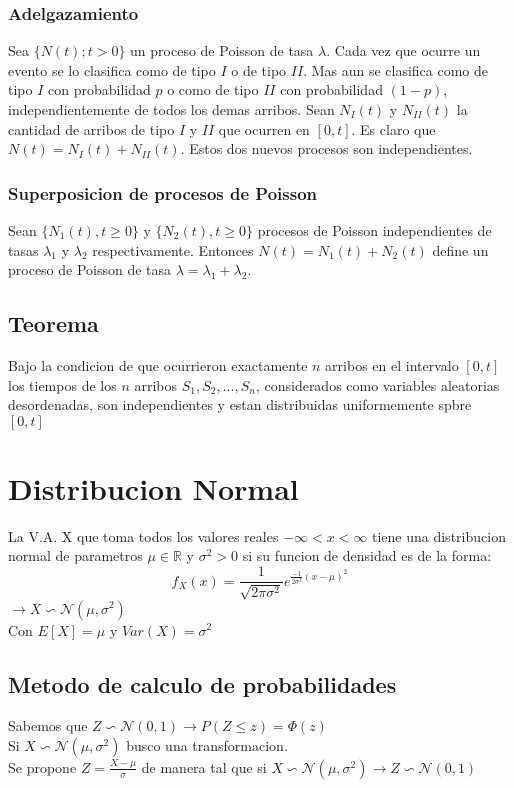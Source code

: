 \documentclass[titlepage,a4paper]{article}
\begin{document}
\subsubsection{Adelgazamiento}
Sea $\{N(t);t>0\}$ un proceso de Poisson de tasa $\lambda$. Cada vez que ocurre un evento se lo clasifica como de tipo $I$ o de tipo 
$II$. Mas aun se clasifica como de tipo $I$ con probabilidad $p$ o como de tipo $II$ con probabilidad $(1-p)$, independientemente de todos los demas arribos.
Sean $N_{I}(t)$ y $N_{II}(t)$ la cantidad de arribos de tipo $I$ y $II$ que ocurren en $[0,t]$. Es claro que $N(t) = N_{I}(t) + N_{II}(t)$. Estos dos nuevos procesos son independientes.
\subsubsection{Superposicion de procesos de Poisson}
Sean $\{N_{1}(t),t\geq0\}$ y $\{N_{2}(t),t\geq0\}$ procesos de Poisson independientes de tasas $\lambda_{1}$ y $\lambda_{2}$ respectivamente. Entonces $N(t)=N_{1}(t)+N_{2}(t)$ 
define un proceso de Poisson de tasa $\lambda = \lambda_{1} + \lambda_{2}$.
\subsection{Teorema}
Bajo la condicion de que ocurrieron exactamente $n$ arribos en el intervalo $[0,t]$ los tiempos de los $n$ arribos $S_{1},S_{2},...,S_{n}$, considerados como variables aleatorias desordenadas, son independientes y estan distribuidas
uniformemente spbre $[0,t]$
\section{Distribucion Normal}
La V.A. X que toma todos los valores reales $-\infty < x< \infty$ tiene una distribucion normal de parametros $\mu \in \mathbb{R} $ y $\sigma^{2}>0$
si su funcion de densidad es de la forma:
\begin{equation*}
    f_{X}(x) = \frac{1}{\sqrt{2\pi\sigma^{2}}}e^{\frac{-1}{2\sigma^{2}}(x-\mu)^{2}}
\end{equation*}
$\rightarrow X \backsim \mathcal{N}(\mu,\sigma^{2})$\\
Con $E[X]=\mu$ y $Var(X)=\sigma^{2}$
\subsection{Metodo de calculo de probabilidades}
Sabemos que $Z \backsim \mathcal{N}(0,1) \rightarrow P(Z \leq z) = \Phi(z)$\\
Si $X \backsim \mathcal{N}(\mu,\sigma^{2})$ busco una transformacion.\\
Se propone $Z = \frac{X-\mu}{\sigma}$ de manera tal que si $X \backsim \mathcal{N}(\mu,\sigma^{2}) \rightarrow Z \backsim \mathcal{N}(0,1)$ 
\end{document}
